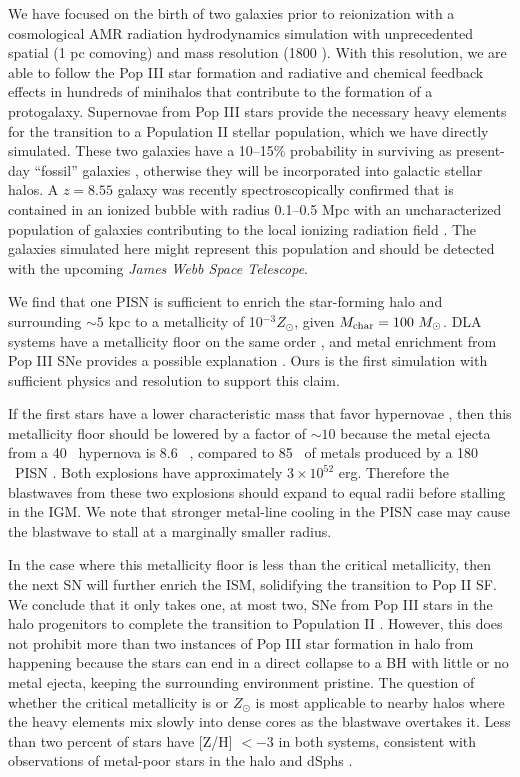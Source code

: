 \documentclass[apjl]{emulateapj}
\begin{document}
We have focused on the birth of two galaxies prior to reionization
with a cosmological AMR radiation hydrodynamics simulation with
unprecedented spatial (1 pc comoving) and mass resolution (1800 \Ms).
With this resolution, we are able to follow the Pop III star formation
and radiative and chemical feedback effects in hundreds of minihalos
that contribute to the formation of a protogalaxy.  Supernovae from
Pop III stars provide the necessary heavy elements for the transition
to a Population II stellar population, which we have directly
simulated.  These two galaxies have a 10--15\% probability in
surviving as present-day ``fossil'' galaxies \citep{Gnedin06},
otherwise they will be incorporated into galactic stellar halos.  A
$z=8.55$ galaxy was recently spectroscopically confirmed that is
contained in an ionized bubble with radius 0.1--0.5 Mpc with an
uncharacterized population of galaxies contributing to the local
ionizing radiation field \citep{Lehnert10_z8.6}.  The galaxies
simulated here might represent this population and should be detected
with the upcoming \textit{James Webb Space Telescope}.

We find that one PISN is sufficient to enrich the star-forming halo
and surrounding $\sim 5$ kpc to a metallicity of 10$^{-3} Z_\odot$,
given $M_{\rm char} = 100~\Ms$.  DLA systems have a metallicity floor
on the same order \citep{Wolfe05_Review, Penprase10}, and metal
enrichment from Pop III SNe provides a possible explanation
\citep{Kobayashi11}.  Ours is the first simulation with sufficient
physics and resolution to support this claim.

If the first stars have a lower characteristic mass that favor
hypernovae \citep{Tumlinson07_IMF}, then this metallicity floor should
be lowered by a factor of $\sim 10$ because the metal ejecta from a 40
\Ms~hypernova is 8.6 \Ms~\citep{Nomoto06}, compared to 85 \Ms~of
metals produced by a 180 \Ms~PISN \citep{Heger02}.  Both explosions
have approximately $3 \times 10^{52}$ erg.  Therefore the blastwaves
from these two explosions should expand to equal radii before stalling
in the IGM.  We note that stronger metal-line cooling in the PISN case
may cause the blastwave to stall at a marginally smaller radius.  

In the case where this metallicity floor is less than the critical
metallicity, then the next SN will further enrich the ISM, solidifying
the transition to Pop II SF.  We conclude that it only takes one, at
most two, SNe from Pop III stars in the halo progenitors to complete
the transition to Population II \citep{Frebel10}.  However, this does
not prohibit more than two instances of Pop III star formation in halo
from happening because the stars can end in a direct collapse to a BH
with little or no metal ejecta, keeping the surrounding environment
pristine.  The question of whether the critical metallicity is
 or  $Z_\odot$ is most applicable to nearby
halos where the heavy elements mix slowly into dense cores as the
blastwave overtakes it.  Less than two percent of stars have [Z/H] $<
-3$ in both systems, consistent with observations of metal-poor stars
in the halo and dSphs \citep{Beers05, Battaglia11}.
\end{document}
